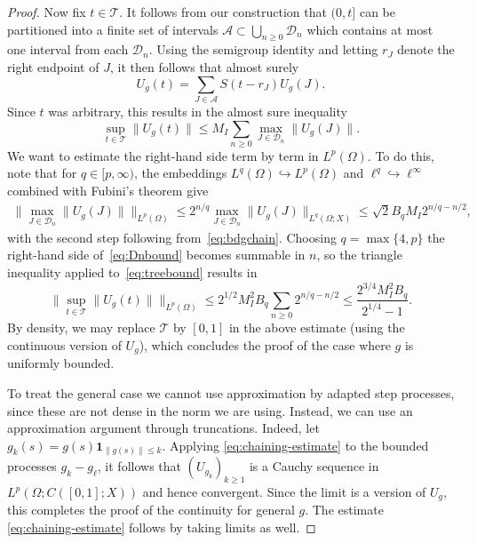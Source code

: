 \documentclass[11pt]{amsart}
\theoremstyle{definition}
\theoremstyle{remark}
\numberwithin{equation}{section}
\newcommand{\1}{\mathbf 1}
\newcommand{\norm}[1]{\lVert #1\rVert}
\newcommand{\one}{\1}
\begin{document}
\begin{proof}
Now fix $t \in \mathcal{T}$.
It follows from our construction that $(0,t]$ can be partitioned into a finite set of intervals $\mathcal{A} \subset \bigcup_{n \geq 0}\mathcal{D}_n$ which contains at most one interval from each $\mathcal{D}_n$.
Using the semigroup identity and letting $r_{J}$ denote the right endpoint of $J$, it then follows that almost surely
\[
 U_g(t)=\sum_{J\in \mathcal{A}}S(t-r_J)U_g(J).
\]
Since $t$ was arbitrary, this results in the almost sure inequality
\begin{equation}
\label{eq:treebound}
 \sup_{t \in \mathcal{T}}\norm{U_g(t)}
 \leq M_{I} \sum_{n \geq 0} \max_{J \in \mathcal{D}_n}\norm{U_g(J)}.
\end{equation}
We want to estimate the right-hand side term by term in $L^p(\Omega)$.
To do this, note that for $q \in [p,\infty)$, the embeddings $L^q(\Omega) \hookrightarrow L^p(\Omega)$ and $\ell^q \hookrightarrow \ell^{\infty}$ combined with Fubini's theorem give 
\begin{align}
    \label{eq:Dnbound}
    \norm{\max_{J \in \mathcal{D}_n}\norm{U_g(J)}}_{L^p(\Omega)}
    \leq 2^{n/q} \max_{J \in \mathcal{D}_n} \norm{U_g(J)}_{L^q(\Omega;X)} \leq \sqrt{2} B_q M_{I} 2^{n/q - n/2},
\end{align}
with the second step following from~\eqref{eq:bdgchain}.
Choosing $q = \max\{4,p\}$ the right-hand side of~\eqref{eq:Dnbound} becomes summable in $n$, so the triangle inequality applied to~\eqref{eq:treebound} results in
\begin{equation}
    \norm{\sup_{t \in \mathcal{T}} \norm{U_g(t)}}_{L^p(\Omega)} \leq 2^{1/2}M_{I}^2 B_{q} \sum_{n\geq 0}  2^{n/q - n/2} \leq \frac{2^{3/4}M_{I}^2 B_{q}} {2^{1/4} - 1}.
\end{equation}
By density, we may replace $\mathcal{T}$ by $[0,1]$ in the above estimate (using the continuous version of $U_g$), which concludes the proof of the case where $g$ is uniformly bounded.

To treat the general case we cannot use approximation by adapted step processes, since these are not dense in the norm we are using. Instead, we can use an approximation argument through truncations. Indeed, 
let $g_k(s) = g(s)\one_{\norm{g(s)} \leq k}$. Applying \eqref{eq:chaining-estimate} to the bounded processes $g_k - g_\ell$, it follows that $(U_{g_k})_{k\geq 1}$ is a Cauchy sequence in $L^p(\Omega;C([0,1];X))$ and hence convergent. Since the limit is a version of $U_g$, this completes the proof of the continuity for general $g$. The estimate \eqref{eq:chaining-estimate} follows by taking limits as well.  
\end{proof}
\end{document}
